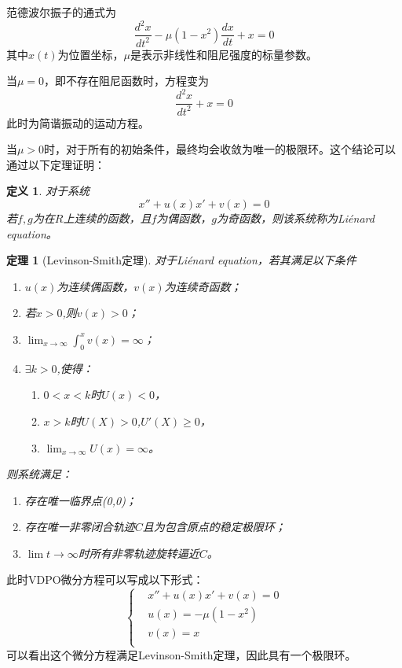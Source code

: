 \documentclass[10.5pt,oneside,a4paper]{article}
\theoremstyle{mystyle}
\newtheorem*{theorem}{定理}
\newtheorem*{definition}{定义}
\begin{document}
范德波尔振子的通式为
\begin{equation}
    \frac{d^2 x}{dt^2}-\mu(1-x^2)\frac{dx}{dt}+x=0
\end{equation}
其中$x(t)$为位置坐标，$\mu$是表示非线性和阻尼强度的标量参数。

当$\mu=0$，即不存在阻尼函数时，方程变为
\begin{equation}
    \frac{d^2 x}{dt^2}+x=0
\end{equation}
此时为简谐振动的运动方程。

当$\mu>0$时，对于所有的初始条件，最终均会收敛为唯一的极限环。这个结论可以通过以下定理证明：

\begin{definition}
    对于系统
    $$x''+u(x)x'+v(x)=0$$
    若$f,g$为在$R$上连续的函数，且$f$为偶函数，$g$为奇函数，则该系统称为Liénard equation。
\end{definition}

\begin{theorem}[Levinson-Smith定理]
    对于Liénard equation，若其满足以下条件
    \begin{enumerate}[align=left]
        \item $u(x)$为连续偶函数，$v(x)$为连续奇函数；
        \item 若$x>0$,则$v(x)>0$；
        \item $\displaystyle\lim_{x \to \infty}\int_{0}^{x}v(x)=\infty$；
        \item $ {\exists}k>0$,使得：
        \begin{enumerate}[label={}]
            \item $0<x<k$时$U(x)<0$，
            \item $x>k$时$U(X)>0$,$U'(X) \geq 0$，
            \item $\displaystyle\lim_{x \to \infty}U(x)=\infty$。
        \end{enumerate}


    \end{enumerate}
    则系统满足：
    \begin{enumerate}[label={}]
        \item 存在唯一临界点(0,0)；
        \item 存在唯一非零闭合轨迹$C$且为包含原点的稳定极限环；
        \item$\lim{t \to \infty}$时所有非零轨迹旋转逼近$C$。
    \end{enumerate}   
\end{theorem}
此时VDPO微分方程可以写成以下形式：
\begin{equation}
    \left \{
    \begin{aligned}
    &x''+u(x)x'+v(x)=0\\
    &u(x)=-\mu(1-x^2)\\
    &v(x)=x\\
    \end{aligned}
\right.
\end{equation}
可以看出这个微分方程满足Levinson-Smith定理，因此具有一个极限环。
\end{document}
